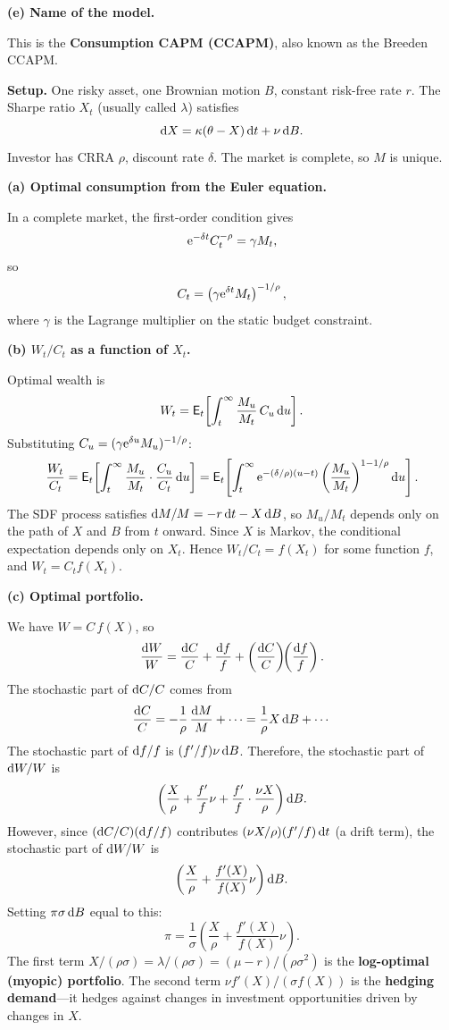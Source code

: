\baselineskip
\textbf{(e) Name of the model.}

This is the \textbf{Consumption CAPM (CCAPM)}, also known as the Breeden CCAPM.


\textbf{Setup.}  One risky asset, one Brownian motion $B$, constant risk-free rate $r$.  The Sharpe ratio $X_t$ (usually called $\lambda$) satisfies
$$\mathrm{d} X = \kappa(\theta - X)\,\mathrm{d} t + \nu\,\mathrm{d} B.$$
Investor has CRRA $\rho$, discount rate $\delta$.  The market is complete, so $M$ is unique.

\baselineskip
\textbf{(a) Optimal consumption from the Euler equation.}

In a complete market, the first-order condition gives
$$\mathrm{e}^{-\delta t}C_t^{-\rho} = \gamma M_t,$$
so
$$C_t = \left(\gamma \mathrm{e}^{\delta t} M_t\right)^{-1/\rho},$$
where $\gamma$ is the Lagrange multiplier on the static budget constraint.

\baselineskip
\textbf{(b) $W_t/C_t$ as a function of $X_t$.}

Optimal wealth is
$$W_t = \mathsf{E}_t\!\left[\int_t^\infty \frac{M_u}{M_t}\,C_u\,\mathrm{d} u\right].$$
Substituting $C_u = (\gamma \mathrm{e}^{\delta u} M_u)^{-1/\rho}$:
$$\frac{W_t}{C_t} = \mathsf{E}_t\!\left[\int_t^\infty \frac{M_u}{M_t}\cdot\frac{C_u}{C_t}\,\mathrm{d} u\right] = \mathsf{E}_t\!\left[\int_t^\infty \mathrm{e}^{-(\delta/\rho)(u-t)}\left(\frac{M_u}{M_t}\right)^{1-1/\rho}\mathrm{d} u\right].$$
The SDF process satisfies $\mathrm{d} M/M = -r\,\mathrm{d} t - X\,\mathrm{d} B$, so $M_u/M_t$ depends only on the path of $X$ and $B$ from $t$ onward.  Since $X$ is Markov, the conditional expectation depends only on $X_t$.  Hence $W_t/C_t = f(X_t)$ for some function $f$, and $W_t = C_t f(X_t)$.

\baselineskip
\textbf{(c) Optimal portfolio.}

We have $W = C\,f(X)$, so
$$\frac{\mathrm{d} W}{W} = \frac{\mathrm{d} C}{C} + \frac{\mathrm{d} f}{f} + \left(\frac{\mathrm{d} C}{C}\right)\!\!\left(\frac{\mathrm{d} f}{f}\right).$$
The stochastic part of $\mathrm{d} C/C$ comes from
$$\frac{\mathrm{d} C}{C} = -\frac{1}{\rho}\,\frac{\mathrm{d} M}{M} + \cdots = \frac{1}{\rho}X\,\mathrm{d} B + \cdots$$
The stochastic part of $\mathrm{d} f/f$ is $(f'/f)\nu\,\mathrm{d} B$.  Therefore, the stochastic part of $\mathrm{d} W/W$ is
$$\left(\frac{X}{\rho} + \frac{f'}{f}\nu + \frac{f'}{f}\cdot\frac{\nu X}{\rho}\right)\mathrm{d} B.$$
However, since $(\mathrm{d} C/C)(\mathrm{d} f/f)$ contributes $(\nu X/\rho)(f'/f)\,\mathrm{d} t$ (a drift term), the stochastic part of $\mathrm{d} W/W$ is
$$\left(\frac{X}{\rho} + \frac{f'(X)}{f(X)}\nu\right)\mathrm{d} B.$$
Setting $\pi\sigma\,\mathrm{d} B$ equal to this:
$$\pi = \frac{1}{\sigma}\!\left(\frac{X}{\rho} + \frac{f'(X)}{f(X)}\nu\right).$$
The first term $X/(\rho\sigma) = \lambda/(\rho\sigma) = (\mu - r)/(\rho\sigma^2)$ is the \textbf{log-optimal (myopic) portfolio}.  The second term $\nu f'(X)/(\sigma f(X))$ is the \textbf{hedging demand}---it hedges against changes in investment opportunities driven by changes in $X$.


